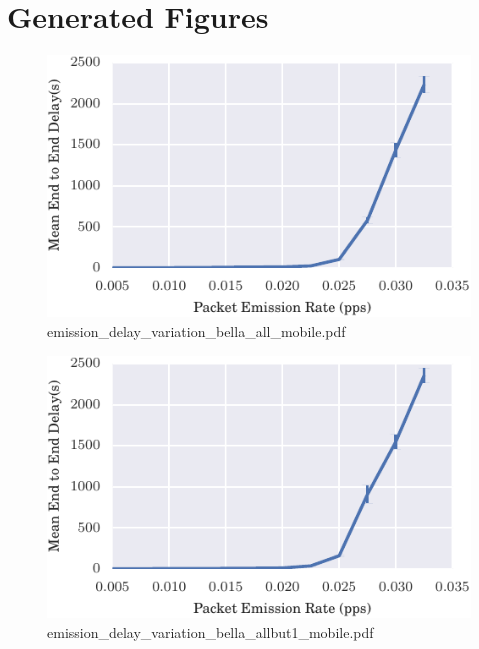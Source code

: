 \documentclass{article}
\begin{document}
\section{Generated Figures}


\begin{figure}[h!]
\centering
\includegraphics[width=\linewidth]{emission_delay_variation_bella_all_mobile.pdf}
\caption{emission\_delay\_variation\_bella\_all\_mobile.pdf}
\end{figure}




\begin{figure}[h!]
\centering
\includegraphics[width=\linewidth]{emission_delay_variation_bella_allbut1_mobile.pdf}
\caption{emission\_delay\_variation\_bella\_allbut1\_mobile.pdf}
\end{figure}
\end{document}
